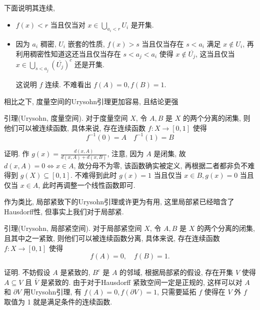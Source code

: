 \documentclass[options]{article}
\renewcommand{\emph}[1]{\CJKunderline{#1}}
\begin{document}
下面说明其连续,
\begin{itemize}
	\item $f(x)<r$ 当且仅当对 $x \in \bigcup_{a_i<r} U_i$ 是开集.
	\item 因为 $a_i$ 稠密, $U_i$ 嵌套的性质, $f(x)>s$ 当且仅当存在 $s<a_i$ 满足 $x \notin U_i$, 再利用稠密性知道这还当且仅当存在 $s<a_j<a_i$ 使得 $x \notin \overline{U_j}$, 这当且仅当 $x \in \bigcup_{s<a_j}\left(\overline{U_j}\right)^c$ 还是开集.

			这说明 $f$ 连续. 不难看出 $f(A)=0, f(B)=1$.
\end{itemize}
\begin{remark}

	相比之下, 度量空间的Urysohn引理更加容易, 且结论更强

	\hrulefill

	引理(Urysohn, 度量空间). 对于度量空间 $X$, 令 $A, B$ 是 $X$ 的两个分离的闭集, 则他们可以被连续函数\emph{完全分离}, 具体来说, 存在连续函数 $f: X \rightarrow[0,1]$ 使得
	\[
			f^{-1}(0)=A \quad f^{-1}(1)=B
	\]
\end{remark}
证明. 作 $g(x)=\frac{d(x, A)}{d(x, A)+d(x, B)}$, 注意, 因为 $A$ 是闭集, 故 $d(x, A)=0 \Longleftrightarrow x \in A$, 故分母不为零, 该函数确实被定义, 再根据二者都非负不难得到 $g(X) \subseteq[0,1]$. 不难得到此时 $g(x)=1$ 当且仅当 $x \in B, g(x)=0$ 当且仅当 $x \in A$, 此时再调整一个线性函数即可.

\begin{remark}
	作为类比, 局部紧致下的Urysohn引理或许更为有用, 这里局部紧已经暗含了Hausdorff性, 但事实上我们对于局部紧.

	\hrulefill

	引理(Urysohn, 局部紧空间). 对于局部紧空间 $X$, 令 $A, B$ 是 $X$ 的两个分离的闭集, 且其中之一紧致, 则他们可以被连续函数分离, 具体来说, 存在连续函数 $f: X \rightarrow[0,1]$ 使得
	\[
			f(A)=0, \quad f(B)=1.
	\]
\end{remark}

证明. 不妨假设 $A$ 是紧致的, $B^c$ 是 $A$ 的邻域, 根据局部紧的假设, 存在开集 $V$ 使得 $A \subseteq V$ 且 $\bar{V}$ 是紧致的. 由于对于Hausdorff 紧致空间一定是正规的, 这样可以对 $A$ 和 $\partial V$ 用Urysohn引理, 有 $f(A)=0, f(\partial V)=1$, 只需要延拓 $f$ 使得在 $V$ 外 $f$ 取值为 1 就是满足条件的连续函数.
\end{document}
